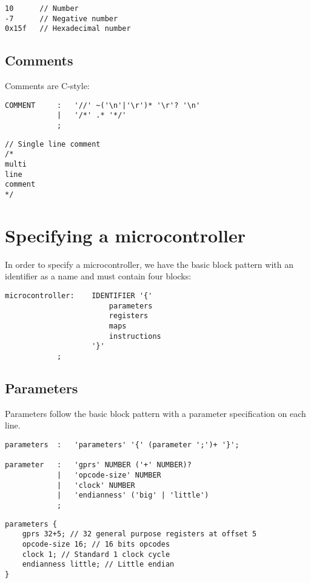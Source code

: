 \lstset{caption=Example numbers}
\begin{lstlisting}
10		// Number
-7		// Negative number
0x15f	// Hexadecimal number
\end{lstlisting}

\subsection{Comments}
Comments are C-style:

\lstset{caption=Comment specifation}
\begin{lstlisting}
COMMENT		:	'//' ~('\n'|'\r')* '\r'? '\n'
			|	'/*' .* '*/'
			;
\end{lstlisting}

\lstset{caption=Example comments}
\begin{lstlisting}
// Single line comment
/*
multi
line
comment
*/
\end{lstlisting}

\section{Specifying a microcontroller}
In order to specify a microcontroller, we have the basic block pattern with an
identifier as a name and must contain four blocks:
\lstset{caption=Microcontroller specification}
\begin{lstlisting}
microcontroller:	IDENTIFIER '{'
						parameters
						registers
						maps
						instructions
					'}'
			;
\end{lstlisting}

\subsection{Parameters}
Parameters follow the basic block pattern with a parameter specification on
each line.

\lstset{caption=Parameter specification}
\begin{lstlisting}
parameters	:	'parameters' '{' (parameter ';')+ '}';

parameter	:	'gprs' NUMBER ('+' NUMBER)?
			|	'opcode-size' NUMBER
			|	'clock' NUMBER
			|	'endianness' ('big' | 'little')
			;
\end{lstlisting}

\lstset{caption=Example parameters}
\begin{lstlisting}
parameters {
	gprs 32+5; // 32 general purpose registers at offset 5
	opcode-size 16; // 16 bits opcodes
	clock 1; // Standard 1 clock cycle
	endianness little; // Little endian
}
\end{lstlisting}

